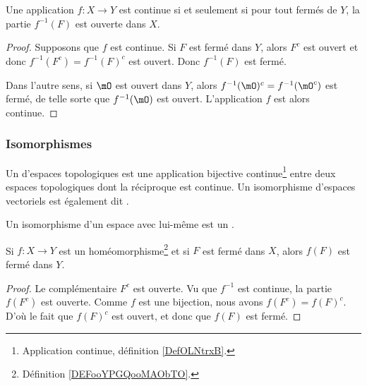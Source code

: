 \begin{lemma}       \label{LEMooATLRooEKnlro}
	Une application \( f\colon X\to Y\) est continue si et seulement si pour tout fermés de \( Y\), la partie \(f^{-1}(F) \) est ouverte dans \( X\).
\end{lemma}

\begin{proof}
	Supposons que \( f\) est continue. Si \( F\) est fermé dans \( Y\), alors \( F^c\) est ouvert et donc \( f^{-1}(F^c)=f^{-1}(F)^c\) est ouvert. Donc \( f^{-1}(F)\) est fermé.

	Dans l'autre sens, si \( \mO\) est ouvert dans \( Y\), alors \( f^{-1}(\mO)^c=f^{-1}(\mO^c)\) est fermé, de telle sorte que \( f^{-1}(\mO)\) est ouvert. L'application \( f\) est alors continue.
\end{proof}


\subsubsection{Isomorphismes}

\begin{definition}      \label{DEFooYPGQooMAObTO}
	Un  d'espaces topologiques est une application bijective continue\footnote{Application continue, définition \ref{DefOLNtrxB}.} entre deux espaces topologiques dont la réciproque est continue. Un isomorphisme d'espaces vectoriels est également dit .

	Un isomorphisme d'un espace avec lui-même est un .
\end{definition}


\begin{lemma}        \label{LEMooMJSHooOszteq}
	Si \( f\colon X\to Y\) est un homéomorphisme\footnote{Définition \ref{DEFooYPGQooMAObTO}.} et si \( F\) est fermé dans \( X\), alors \( f(F)\) est fermé dans \( Y\).
\end{lemma}

\begin{proof}
	Le complémentaire \( F^c\) est ouverte. Vu que \( f^{-1}\) est continue, la partie \( f(F^c)\) est ouverte. Comme \( f\) est une bijection, nous avons \( f(F^c)=f(F)^c\). D'où le fait que \( f(F)^c\) est ouvert, et donc que \( f(F)\) est fermé.
\end{proof}

